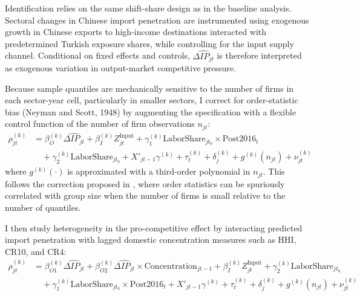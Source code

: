 \documentclass[12pt]{article}
\begin{document}
Identification relies on the same shift-share design as in the baseline analysis. Sectoral changes in Chinese import penetration are instrumented using exogenous growth in Chinese exports to high-income destinations interacted with predetermined Turkish exposure shares, while controlling for the input supply channel. Conditional on fixed effects and controls, $\widehat{\Delta IP_{jt}}$ is therefore interpreted as exogenous variation in output-market competitive pressure. 

Because sample quantiles are mechanically sensitive to the number of firms in each sector-year cell, particularly in smaller sectors, I correct for order-statistic bias (Neyman and Scott, 1948) by augmenting the specification with a flexible control function of the number of firm observations $n_{jt}$:
\begin{equation}
\begin{aligned}
\rho_{jt}^{(k)} &= \beta_O^{(k)} \widehat{\Delta IP_{jt}} + \beta_I^{(k)} Z_{jt}^{\text{Input}} + \gamma_1^{(k)} \text{LaborShare}_{jt_0} \times \text{Post2016}_t \\
&\quad + \gamma_2^{(k)} \text{LaborShare}_{jt_0} + X'_{jt-1} \gamma^{(k)} + \tau_t^{(k)} + \delta_j^{(k)} + g^{(k)}(n_{jt}) + \nu_{jt}^{(k)}
\end{aligned}
\end{equation}
where $g^{(k)}(\cdot)$ is approximated with a third-order polynomial in $n_{jt}$. This follows the correction proposed in \textcite{backusWhyProductivityCorrelated2020}, where order statistics can be spuriously correlated with group size when the number of firms is small relative to the number of quantiles.

I then study heterogeneity in the pro-competitive effect by interacting predicted import penetration with lagged domestic concentration measures such as HHI, CR10, and CR4:
\begin{equation}
\begin{aligned}
\rho_{jt}^{(k)} &= \beta_{O1}^{(k)} \widehat{\Delta IP_{jt}} + \beta_{O2}^{(k)} \widehat{\Delta IP_{jt}} \times \text{Concentration}_{jt-1} + \beta_I^{(k)} Z_{jt}^{\text{Input}}  + \gamma_2^{(k)} \text{LaborShare}_{jt_0} \\
&\quad + \gamma_1^{(k)} \text{LaborShare}_{jt_0} \times \text{Post2016}_t + X'_{jt-1} \gamma^{(k)} + \tau_t^{(k)} + \delta_j^{(k)} + g^{(k)}(n_{jt}) + \nu_{jt}^{(k)}
\end{aligned}
\end{equation}
\end{document}

